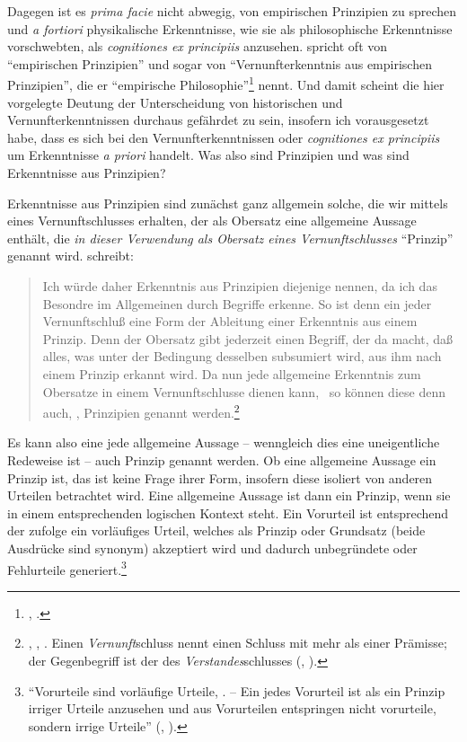 Dagegen ist es \emph{prima facie} nicht abwegig, von empirischen Prinzipien zu
sprechen und \emph{a fortiori} physikalische Erkenntnisse, wie sie
 als philosophische Erkenntnisse
vorschwebten, als \emph{cognitiones ex principiis} anzusehen.
 spricht oft von \enquote{empirischen Prinzipien} und sogar von \enquote{Vernunfterkenntnis aus empirischen
Prinzipien}, die er \enquote{empirische Philosophie}\footnote{\cite[][B
868]{Kant:KritikderreinenVernunft2003}, \cite[][III:
543.25--26]{Kant:GesammelteWerke1900ff.}.} nennt.
Und damit scheint die hier vorgelegte Deutung der Unterscheidung von
historischen und Vernunfterkenntnissen durchaus gefährdet zu sein, insofern ich
vorausgesetzt habe, dass es sich bei den Vernunfterkenntnissen oder
\emph{cognitiones ex principiis} um Erkenntnisse \emph{a priori} handelt. Was
also sind Prinzipien und was sind Erkenntnisse aus Prinzipien?

Erkenntnisse aus Prinzipien sind zunächst ganz allgemein solche, die wir mittels
eines Vernunftschlusses erhalten, der als Obersatz eine allgemeine Aussage
enthält, die \emph{in dieser Verwendung als Obersatz eines Vernunftschlusses}
\enquote{Prinzip} genannt wird.  schreibt:
\begin{quote}
Ich würde daher
Erkenntnis aus Prinzipien diejenige nennen, da ich das Besondre im Allgemeinen durch Begriffe erkenne. So ist denn
ein jeder Vernunftschluß eine Form der Ableitung einer Erkenntnis aus einem
Prinzip. Denn der Obersatz gibt jederzeit einen Begriff, der da macht, daß
alles, was unter der Bedingung desselben subsumiert wird, aus ihm nach einem
Prinzip erkannt wird. Da nun jede allgemeine Erkenntnis zum Obersatze in einem
Vernunftschlusse dienen kann, \punkt\ so können diese denn auch, , Prinzipien genannt werden.\footnote{\cite[][B
357]{Kant:KritikderreinenVernunft2003}, \cite[][III:
238.24--32]{Kant:GesammelteWerke1900ff.}, \myherv . Einen \emph{Vernunft}schluss
nennt  einen Schluss mit mehr als einer Prämisse; der
Gegenbegriff ist der des \emph{Verstandes}schlusses \mkbibparens{\cite[vgl.][B
360]{Kant:KritikderreinenVernunft2003},
\cite[][III: 240.14--20]{Kant:GesammelteWerke1900ff.}}.}
\end{quote}
Es kann also eine jede allgemeine Aussage -- wenngleich dies eine uneigentliche
Redeweise ist -- auch Prinzip genannt werden. Ob eine allgemeine Aussage ein Prinzip ist, das ist
keine Frage ihrer Form, insofern diese isoliert von anderen Urteilen betrachtet
wird. Eine allgemeine Aussage ist dann ein Prinzip, wenn sie in einem
entsprechenden logischen Kontext steht. Ein Vorurteil ist entsprechend der
 zufolge ein vorläufiges Urteil, welches als Prinzip oder Grundsatz
(beide Ausdrücke sind synonym) akzeptiert wird und dadurch unbegründete oder
Fehlurteile generiert.\footnote{\enquote{Vorurteile sind vorläufige Urteile,
. -- Ein jedes Vorurteil
ist als ein Prinzip irriger Urteile anzusehen und aus Vorurteilen entspringen
nicht vorurteile, sondern irrige Urteile} \mkbibparens{\cite[][A
116]{Kant:ImmanuelKantsLogik1977}, \cite[][IX:
75.24--27]{Kant:GesammelteWerke1900ff.}}.}

